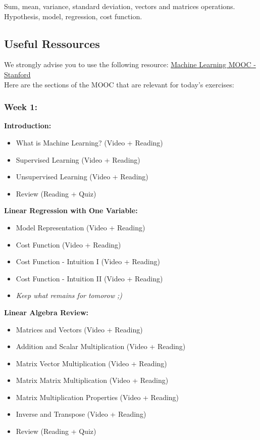 \documentclass[]{article}
\begin{document}
Sum, mean, variance, standard deviation, vectors and matrices
operations.\\
Hypothesis, model, regression, cost function.

\hypertarget{useful-ressources}{%
\subsection{Useful Ressources}\label{useful-ressources}}

We strongly advise you to use the following resource:
\href{https://www.coursera.org/learn/machine-learning/home/week/1}{Machine
Learning MOOC - Stanford}\\
Here are the sections of the MOOC that are relevant for today's
exercises:

\hypertarget{week-1}{%
\subsubsection{Week 1:}\label{week-1}}

\textbf{Introduction:}

\begin{itemize}
\item
  What is Machine Learning? (Video + Reading)
\item
  Supervised Learning (Video + Reading)
\item
  Unsupervised Learning (Video + Reading)
\item
  Review (Reading + Quiz)
\end{itemize}

\textbf{Linear Regression with One Variable:}

\begin{itemize}
\item
  Model Representation (Video + Reading)
\item
  Cost Function (Video + Reading)
\item
  Cost Function - Intuition I (Video + Reading)
\item
  Cost Function - Intuition II (Video + Reading)
\item
  \emph{Keep what remains for tomorow ;)}
\end{itemize}

\textbf{Linear Algebra Review:}

\begin{itemize}
\item
  Matrices and Vectors (Video + Reading)
\item
  Addition and Scalar Multiplication (Video + Reading)
\item
  Matrix Vector Multiplication (Video + Reading)
\item
  Matrix Matrix Multiplication (Video + Reading)
\item
  Matrix Multiplication Properties (Video + Reading)
\item
  Inverse and Transpose (Video + Reading)
\item
  Review (Reading + Quiz)
\end{itemize}
\end{document}
